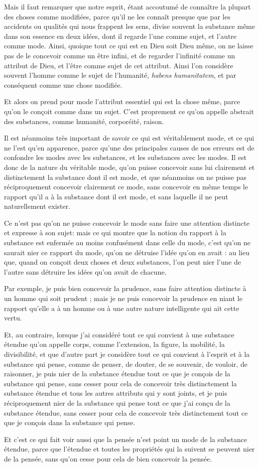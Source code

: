 Mais il faut remarquer que notre esprit, étant accoutumé de connaître la plupart des choses comme modifiées, parce qu'il ne les connaît presque que par les accidents ou qualités qui nous frappent les sens, divise souvent la substance même dans son essence en deux idées, dont il regarde l'une comme sujet, et l'autre comme mode. Ainsi, quoique tout ce qui est en Dieu soit Dieu même, on ne laisse pas de le concevoir comme un être infini, et de regarder l'infinité comme un attribut de Dieu, et l'être comme sujet de cet attribut. Ainsi l'on considère souvent l'homme comme le sujet de l'humanité, \emph{habens humanitatem}, et par conséquent comme une chose modifiée.

Et alors on prend pour mode l'attribut essentiel qui est la chose même, parce qu'on le conçoit comme dans un sujet. C'est proprement ce qu'on appelle abstrait des substances, comme humanité, corporéité, raison.

Il est néanmoins très important de savoir ce qui est véritablement mode, et ce qui ne l'est qu'en apparence, parce qu'une des principales causes de nos erreurs est de confondre les modes avec les substances, et les substances avec les modes. Il est donc de la nature du véritable mode, qu'on puisse concevoir sans lui clairement et distinctement la substance dont il est mode, et que néanmoins on ne puisse pas réciproquement concevoir clairement ce mode, sans concevoir en même temps le rapport qu'il a à la substance dont il est mode, et sans laquelle il ne peut naturellement exister.

Ce n'est pas qu'on ne puisse concevoir le mode sans faire une attention distincte et expresse à son sujet: mais ce qui montre que la notion du rapport à la substance est enfermée au moins confusément dans celle du mode, c'est qu'on ne saurait nier ce rapport du mode, qu'on ne détruise l'idée qu'on en avait : au lieu que, quand on conçoit deux choses et deux substances, l'on peut nier l'une de l'autre sans détruire les idées qu'on avait de chacune.

Par exemple, je puis bien concevoir la prudence, sans faire attention distincte à un homme qui soit prudent ; mais je ne puis concevoir la prudence en niant le rapport qu'elle a à un homme ou à une autre nature intelligente qui ait cette vertu.

Et, au contraire, lorsque j'ai considéré tout ce qui convient à une substance étendue qu'on appelle corps, comme l'extension, la figure, la mobilité, la divisibilité, et que d'autre part je considère tout ce qui convient à l'esprit et à la substance qui pense, comme de penser, de douter, de se souvenir, de vouloir, de raisonner, je puis nier de la substance étendue tout ce que je conçois de la substance qui pense, sans cesser pour cela de concevoir très distinctement la substance étendue et tous les autres attributs qui y sont joints, et je puis réciproquement nier de la substance qui pense tout ce que j'ai conçu de la substance étendue, sans cesser pour cela de concevoir très distinctement tout ce que je conçois dans la substance qui pense.

Et c'est ce qui fait voir aussi que la pensée n'est point un mode de la substance étendue, parce que l'étendue et toutes les propriétés qui la suivent se peuvent nier de la pensée, sans qu'on cesse pour cela de bien concevoir la pensée.

